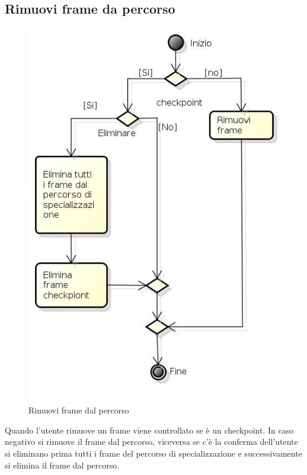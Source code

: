 \subsection{Rimuovi frame da percorso}

\begin{figure}[h!]
		\centering
		\includegraphics[scale=.2]{img/Rimuovi_frame_da_percorso.jpg}
		\caption{Rimuovi frame dal percorso}
		\label{fig:ModelloSpy}
\end{figure}

Quando l'utente rimuove un frame viene controllato se è un checkpoint. In caso negativo si rimuove il frame dal percorso, viceversa se c'è la conferma dell'utente si eliminano prima tutti i frame del percorso di specializzazione e successivamente si elimina il frame dal percorso. 
